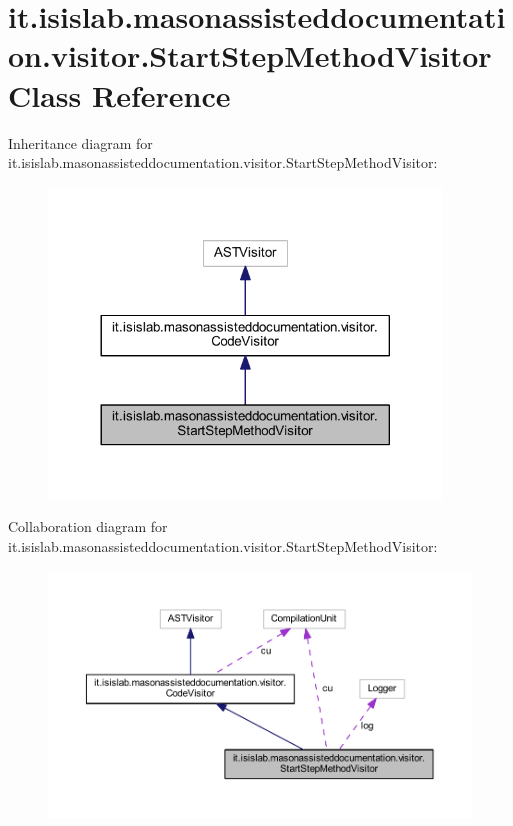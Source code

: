 \hypertarget{classit_1_1isislab_1_1masonassisteddocumentation_1_1visitor_1_1_start_step_method_visitor}{\section{it.\-isislab.\-masonassisteddocumentation.\-visitor.\-Start\-Step\-Method\-Visitor Class Reference}
\label{classit_1_1isislab_1_1masonassisteddocumentation_1_1visitor_1_1_start_step_method_visitor}
}


Inheritance diagram for it.\-isislab.\-masonassisteddocumentation.\-visitor.\-Start\-Step\-Method\-Visitor\-:\nopagebreak
\begin{figure}[H]
\begin{center}
\leavevmode
\includegraphics[width=296pt]{classit_1_1isislab_1_1masonassisteddocumentation_1_1visitor_1_1_start_step_method_visitor__inherit__graph}
\end{center}
\end{figure}


Collaboration diagram for it.\-isislab.\-masonassisteddocumentation.\-visitor.\-Start\-Step\-Method\-Visitor\-:\nopagebreak
\begin{figure}[H]
\begin{center}
\leavevmode
\includegraphics[width=350pt]{classit_1_1isislab_1_1masonassisteddocumentation_1_1visitor_1_1_start_step_method_visitor__coll__graph}
\end{center}
\end{figure}
